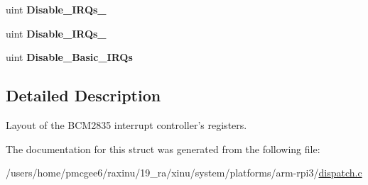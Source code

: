 \begin{DoxyCompactItemize}
\item 
\hypertarget{structbcm2835__interrupt__registers_a21df85ad19bd9631601310a7e33904df}{uint {\bfseries Disable\-\_\-\-I\-R\-Qs\-\_}}\label{structbcm2835__interrupt__registers_a21df85ad19bd9631601310a7e33904df}

\item 
\hypertarget{structbcm2835__interrupt__registers_a5ab23529be15a2054cd66bda1f39f45c}{uint {\bfseries Disable\-\_\-\-I\-R\-Qs\-\_}}\label{structbcm2835__interrupt__registers_a5ab23529be15a2054cd66bda1f39f45c}

\item 
\hypertarget{structbcm2835__interrupt__registers_ace8f0a10689ec366dfaa5d88ad31ff13}{uint {\bfseries Disable\-\_\-\-Basic\-\_\-\-I\-R\-Qs}}\label{structbcm2835__interrupt__registers_ace8f0a10689ec366dfaa5d88ad31ff13}

\end{DoxyCompactItemize}


\subsection{Detailed Description}
Layout of the B\-C\-M2835 interrupt controller's registers. 

The documentation for this struct was generated from the following file\-:\begin{DoxyCompactItemize}
\item 
/users/home/pmcgee6/raxinu/19\-\_\-ra/xinu/system/platforms/arm-\/rpi3/\hyperlink{dispatch_8c}{dispatch.\-c}\end{DoxyCompactItemize}
